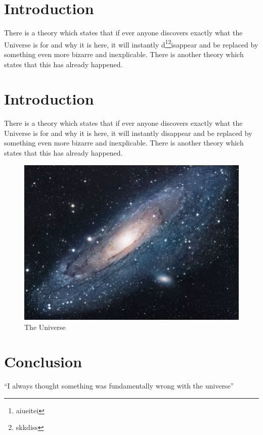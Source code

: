 \documentclass[a4paper,10pt,twoside,uplatex,dvipdfmx]{jsarticle}
\begin{document}
\section{Introduction}
There is a theory which states that if ever anyone discovers exactly what the Universe is for and why it is here, it will instantly d\footnote{aiueitei}\footnote{skkdiss}isappear and be replaced by something even more bizarre and inexplicable.
There is another theory which states that this has already happened.

\section{Introduction}
There is a theory which states that if ever anyone discovers exactly what the Universe is for and why it is here, it will instantly disappear and be replaced by something even more bizarre and inexplicable.
There is another theory which states that this has already happened.


\begin{figure}[h!]
\centering
\includegraphics[scale=1.7]{universe}
\caption{The Universe}
\label{fig:universe}
\end{figure}

\section{Conclusion}
``I always thought something was fundamentally wrong with the universe'' \citep{adams1995hitchhiker}



\end{document}
